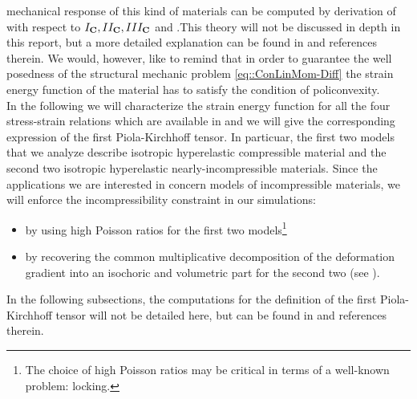 mechanical response of this kind of materials can be computed by
derivation of \W with respect to $I_{\textbf{C}},II_{\textbf{C}},III_{\textbf{C}}$ and \C.This
theory will not be discussed in depth in this report, but a more
detailed explanation can be found in \cite{GM,Deluca} and references
therein. We would, however, like to remind that in order to guarantee
the well posedness of the structural mechanic problem
\eqref{eq::ConLinMom-Diff} the strain energy function \W of the
material has to satisfy the condition of policonvexity.\\ In the
following we will characterize the strain energy function for all the
four stress-strain relations which are available in \LV and we will
give the corresponding expression of the first Piola-Kirchhoff
tensor. In particuar, the first two models that we analyze describe
isotropic hyperelastic compressible material and the second two
isotropic hyperelastic nearly-incompressible materials. Since the
applications we are interested in concern models of incompressible
materials, we will enforce the incompressibility constraint in our
simulations:
\begin{itemize}
\item by using high Poisson ratios for the first two
  models\footnote{The choice of high Poisson ratios may be critical in
    terms of a well-known problem: locking.}
\item by recovering the common multiplicative decomposition of the
  deformation gradient \F into an isochoric and volumetric part for the
  second two (see \cite{BonetWood}).
\end{itemize} In the following subsections, the computations for the
definition of the first Piola-Kirchhoff tensor will not be detailed
here, but can be found in \cite{Deluca} and references therein.

